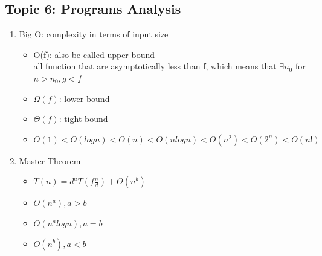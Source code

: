 \documentclass[11pt, a4paper]{article}
\begin{document}
\begin{multicols}{3}
\section*{Topic 6: Programs Analysis}
    \begin{enumerate}
        \item Big O: complexity in terms of input size
            \begin{itemize}
                \item O(f): also be called upper bound\\
                    all function that are asymptotically less than f, which means that $\exists n_0$ for $n > n_0, g < f$
                \item $\Omega(f)$: lower bound
                \item $\Theta(f)$: tight bound
                \item $O(1) < O(logn) < O(n) < O(nlogn) < O(n^2) < O(2^n) < O(n!)$
            \end{itemize}
        \item Master Theorem
            \begin{itemize}
                \item $T(n) = d^a T(f\frac{n}{d}) + \Theta(n^b)$
                \item $O(n^a), a>b$
                \item $O(n^alogn), a=b$
                \item $O(n^b), a<b$
            \end{itemize}
    \end{enumerate}


\end{multicols}
\end{document}

